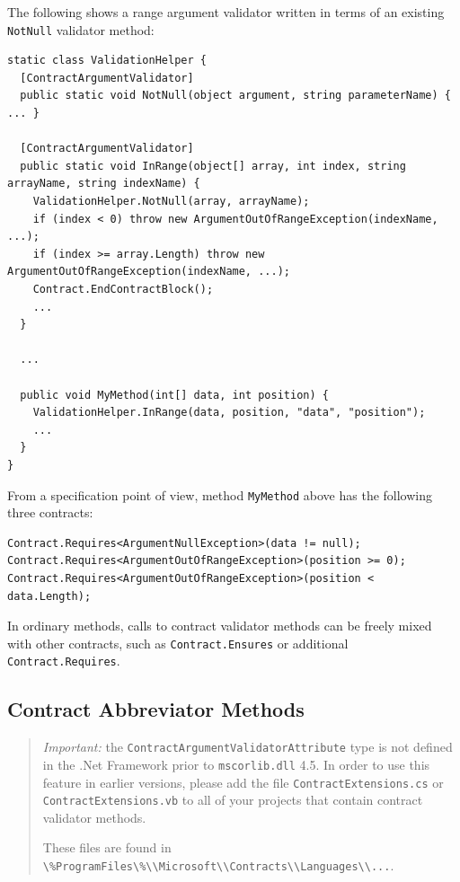 \documentclass{article}
\newcommand{\code}[1]{\lstinline{#1}}
\begin{document}
The following shows a range argument validator written in terms of an
existing \code{NotNull} validator method:
\begin{lstlisting}
static class ValidationHelper {
  [ContractArgumentValidator]
  public static void NotNull(object argument, string parameterName) { ... }

  [ContractArgumentValidator]
  public static void InRange(object[] array, int index, string arrayName, string indexName) {
    ValidationHelper.NotNull(array, arrayName);
    if (index < 0) throw new ArgumentOutOfRangeException(indexName, ...);
    if (index >= array.Length) throw new ArgumentOutOfRangeException(indexName, ...);
    Contract.EndContractBlock();
    ...
  }

  ...

  public void MyMethod(int[] data, int position) {
    ValidationHelper.InRange(data, position, "data", "position");
    ...
  }
}
\end{lstlisting}
\noindent
From a specification point of view, method \code{MyMethod} above has
the following three contracts:
\begin{lstlisting}[frame=none]
Contract.Requires<ArgumentNullException>(data != null);
Contract.Requires<ArgumentOutOfRangeException>(position >= 0);
Contract.Requires<ArgumentOutOfRangeException>(position < data.Length);
\end{lstlisting}
In ordinary methods, calls to contract validator methods can be freely mixed with
other contracts, such as \code{Contract.Ensures} or additional
\code{Contract.Requires}.


\subsection{Contract Abbreviator Methods}
\label{sec:contractabbreviators}
\begin{quote}
\emph{Important:} the \code{ContractArgumentValidatorAttribute} type
is not defined in the .Net Framework prior to \code{mscorlib.dll} 4.5. In order to use this
feature in earlier versions, please add the file \code{ContractExtensions.cs} or
\code{ContractExtensions.vb} to all of your projects that contain
contract validator methods.

\noindent These files are found in \code{\%ProgramFiles\%\\Microsoft\\Contracts\\Languages\\...}.
\end{quote}
\end{document}
